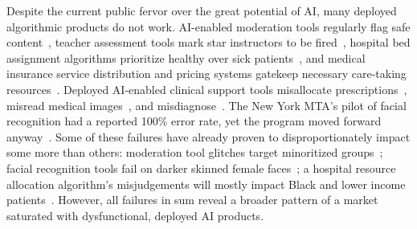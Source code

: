 \documentclass[acmconf,manuscript,screen,natbib=true]{acmart}
\begin{document}
Despite the current public fervor over the great potential of AI,
many deployed algorithmic products do not work.
AI-enabled moderation tools regularly flag safe content~\cite{tiktokerror, fb_hoes, fb_nudity}, teacher assessment tools mark star instructors to be fired~\cite{richardson2019litigating, paige2020houston}, 
hospital bed assignment algorithms prioritize healthy over sick patients~\cite{obermeyer2019dissecting}, and  medical insurance service distribution and pricing systems gatekeep necessary care-taking resources~\cite{lecher2018happens, richardson2019litigating}. Deployed AI-enabled clinical support tools 
misallocate prescriptions~\cite{pain_wired}, 
misread medical images~\cite{freeman2021use,oakden2020hidden}, 
and misdiagnose~\cite{Strickland_undated-ng, sepsis_validation}. The New York MTA's pilot of facial recognition had a reported 100\% error rate, yet the program moved forward anyway~\cite{berger2019mta}.
Some of these failures have already proven to disproportionately impact some more than others: moderation tool glitches target minoritized groups~\cite{diaz2021double}; facial recognition tools fail on darker skinned female faces~\cite{Buolamwini_undated-dd}; a hospital resource allocation algorithm's misjudgements will mostly impact Black and lower income patients~\cite{obermeyer2019dissecting}. However, all failures in sum reveal a broader pattern of a market saturated with dysfunctional, deployed AI products.
\end{document}
